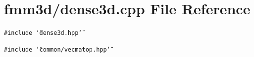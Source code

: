 \section{fmm3d/dense3d.cpp File Reference}
\label{dense3d_8cpp}


{\tt \#include \char`\"{}dense3d.hpp\char`\"{}}\par
{\tt \#include \char`\"{}common/vecmatop.hpp\char`\"{}}\par
